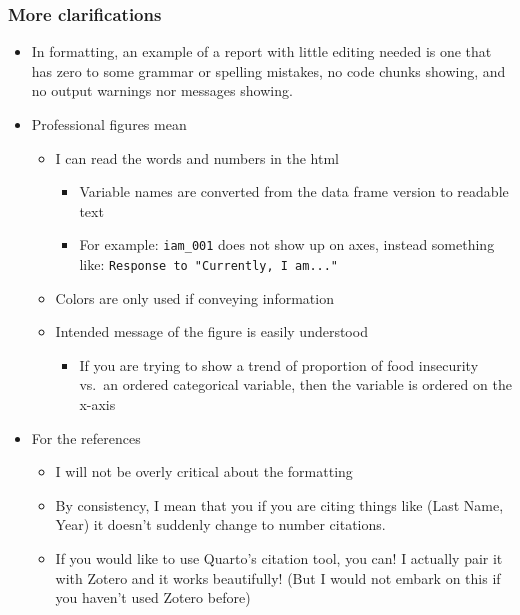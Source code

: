 \documentclass[
  letterpaper,
  DIV=11,
  numbers=noendperiod]{scrartcl}
\providecommand{\tightlist}{%
  \setlength{\itemsep}{0pt}\setlength{\parskip}{0pt}}\usepackage{longtable,booktabs,array}
\begin{document}
\subsubsection{More clarifications}

\begin{itemize}
\item
  In formatting, an example of a report with little editing needed is
  one that has zero to some grammar or spelling mistakes, no code chunks
  showing, and no output warnings nor messages showing.
\item
  Professional figures mean

  \begin{itemize}
  \item
    I can read the words and numbers in the html

    \begin{itemize}
    \item
      Variable names are converted from the data frame version to
      readable text
    \item
      For example: \texttt{iam\_001} does not show up on axes, instead
      something like: \texttt{Response\ to\ "Currently,\ I\ am..."}
    \end{itemize}
  \item
    Colors are only used if conveying information
  \item
    Intended message of the figure is easily understood

    \begin{itemize}
    \tightlist
    \item
      If you are trying to show a trend of proportion of food insecurity
      vs.~an ordered categorical variable, then the variable is ordered
      on the x-axis
    \end{itemize}
  \end{itemize}
\item
  For the references

  \begin{itemize}
  \item
    I will not be overly critical about the formatting
  \item
    By consistency, I mean that you if you are citing things like (Last
    Name, Year) it doesn't suddenly change to number citations.
  \item
    If you would like to use Quarto's citation tool, you can! I actually
    pair it with Zotero and it works beautifully! (But I would not
    embark on this if you haven't used Zotero before)
  \end{itemize}
\end{itemize}
\end{document}
